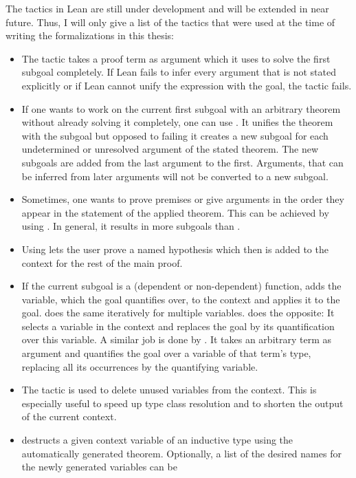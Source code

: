 The tactics in Lean are still under development and will be extended in near
future.
Thus, I will only give a list of the tactics that were used at the time of
writing the formalizations in this thesis:
\begin{itemize}
\item The tactic  takes a proof term as argument which it uses
to solve the first subgoal completely.
If Lean fails to infer every argument that is not stated explicitly or if Lean
cannot unify the expression with the goal, the tactic fails.
\item If one wants to work on the current first subgoal with an arbitrary theorem
without already solving it completely, one can use .
It unifies the theorem with the subgoal but opposed to failing it creates a new
subgoal for each undetermined or unresolved argument of the stated theorem.
The new subgoals are added from the last argument to the first.
Arguments, that can be inferred from later arguments will not be converted to a
new subgoal.
\item Sometimes, one wants to prove premises or give arguments in the order
they appear in the statement of the applied theorem.
This can be achieved by using .
In general, it results in more subgoals than .
\item Using  lets the user prove a named hypothesis which then is added
to the context for the rest of the main proof.
\item If the current subgoal is a (dependent or non-dependent) function, 
adds the variable, which the goal quantifies over, to the context and applies it
to the goal.  does the same iteratively for multiple variables.
 does the opposite: It selects a variable in the context and
replaces the goal by its quantification over this variable.
A similar job is done by .
It takes an arbitrary term as argument and quantifies the goal over a variable of
that term's type, replacing all its occurrences by the quantifying variable.
\item The tactic  is used to delete unused variables from the context.
This is especially useful to speed up type class resolution and to shorten the output
of the current context.
\item {} destructs a given context variable of an inductive type 
using the automatically generated  theorem.
Optionally, a list of the desired names for the newly generated variables can be

\end{itemize}
